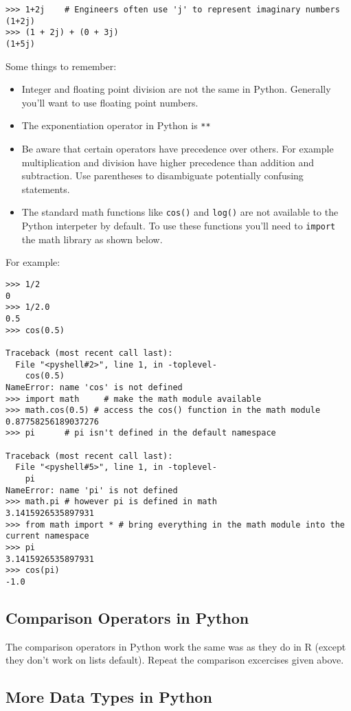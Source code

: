 \begin{lstlisting}
>>> 1+2j    # Engineers often use 'j' to represent imaginary numbers
(1+2j)
>>> (1 + 2j) + (0 + 3j)
(1+5j)
\end{lstlisting}
Some things to remember:

\begin{itemize}
\item
  Integer and floating point division are not the same in Python.
  Generally you'll want to use floating point numbers.
\item
  The exponentiation operator in Python is \lstinline!**!
\item
  Be aware that certain operators have precedence over others. For
  example multiplication and division have higher precedence than
  addition and subtraction. Use parentheses to disambiguate potentially
  confusing statements.
\item
  The standard math functions like \lstinline!cos()! and
  \lstinline!log()! are not available to the Python interpeter by
  default. To use these functions you'll need to \lstinline!import! the
  math library as shown below.
\end{itemize}
For example:

\begin{lstlisting}
>>> 1/2
0
>>> 1/2.0
0.5    
>>> cos(0.5)

Traceback (most recent call last):
  File "<pyshell#2>", line 1, in -toplevel-
    cos(0.5)
NameError: name 'cos' is not defined
>>> import math     # make the math module available
>>> math.cos(0.5) # access the cos() function in the math module
0.87758256189037276
>>> pi      # pi isn't defined in the default namespace

Traceback (most recent call last):
  File "<pyshell#5>", line 1, in -toplevel-
    pi
NameError: name 'pi' is not defined
>>> math.pi # however pi is defined in math
3.1415926535897931
>>> from math import * # bring everything in the math module into the current namespace
>>> pi
3.1415926535897931
>>> cos(pi)
-1.0
\end{lstlisting}
\subsection{Comparison Operators in Python}

The comparison operators in Python work the same was as they do in R
(except they don't work on lists default). Repeat the comparison
excercises given above.

\subsection{More Data Types in Python}

